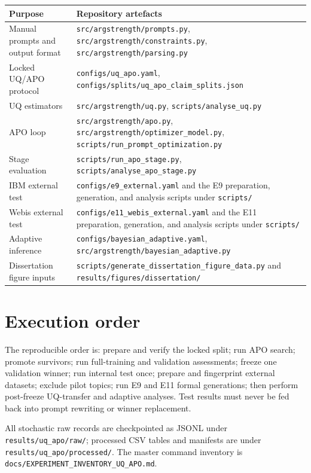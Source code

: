 \documentclass[11pt,twoside,a4paper]{report}
\begin{document}
\begin{longtable}{@{}p{}p{}@{}}
\toprule
Purpose & Repository artefacts \\
\midrule
Manual prompts and output format & \texttt{src/argstrength/prompts.py},
\texttt{src/argstrength/constraints.py}, \texttt{src/argstrength/parsing.py} \\
Locked UQ/APO protocol & \texttt{configs/uq\_apo.yaml},
\texttt{configs/splits/uq\_apo\_claim\_splits.json} \\
UQ estimators & \texttt{src/argstrength/uq.py},
\texttt{scripts/analyse\_uq.py} \\
APO loop & \texttt{src/argstrength/apo.py},
\texttt{src/argstrength/optimizer\_model.py},
\texttt{scripts/run\_prompt\_optimization.py} \\
Stage evaluation & \texttt{scripts/run\_apo\_stage.py},
\texttt{scripts/analyse\_apo\_stage.py} \\
IBM external test & \texttt{configs/e9\_external.yaml} and the E9 preparation,
generation, and analysis scripts under \texttt{scripts/} \\
Webis external test & \texttt{configs/e11\_webis\_external.yaml} and the E11
preparation, generation, and analysis scripts under \texttt{scripts/} \\
Adaptive inference & \texttt{configs/bayesian\_adaptive.yaml},
\texttt{src/argstrength/bayesian\_adaptive.py} \\
Dissertation figure inputs &
\texttt{scripts/generate\_dissertation\_figure\_data.py} and
\texttt{results/figures/dissertation/} \\
\bottomrule
\end{longtable}

\section{Execution order}

The reproducible order is: prepare and verify the locked split; run APO search;
promote survivors; run full-training and validation assessments; freeze one
validation winner; run internal test once; prepare and fingerprint external
datasets; exclude pilot topics; run E9 and E11 formal generations; then perform
post-freeze UQ-transfer and adaptive analyses.  Test results must never be fed
back into prompt rewriting or winner replacement.

All stochastic raw records are checkpointed as JSONL under
\texttt{results/uq\_apo/raw/}; processed CSV tables and manifests are under
\texttt{results/uq\_apo/processed/}.  The master command inventory is
\texttt{docs/EXPERIMENT\_INVENTORY\_UQ\_APO.md}.
\end{document}
